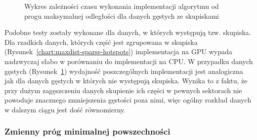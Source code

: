 \documentclass[12pt]{article}
\begin{document}
\begin{figure}[H]
\caption{Wykres zależności czasu wykonania implementacji algorytmu od progu maksymalnej odległości dla danych gęstych ze skupiskami}
\label{chart:maxdist-nonsparse-hotspots}
\end{figure}

Podobne testy zostały wykonane dla danych, w których występują tzw. skupiska. Dla rzadkich danych, których część jest zgrupowana w skupiska (Rysunek~\ref{chart:maxdist-sparse-hotspots}) implementacja na GPU wypada nadzwyczaj słabo w porównaniu do implementacji na CPU. W przypadku danych gęstych (Rysunek~\ref{chart:maxdist-nonsparse-hotspots}) 
wydajność poszczególnych implementacji jest analogiczna jak dla danych gęstych w których nie występują skupiska. Wynika to z faktu, że przy dużym zagęszczeniu danych skupienie ich części w pewnych sektorach nie powoduje znacznego zmniejszenia gęstości poza nimi, więc ogólny rozkład danych w dalszym ciągu jest dość równomierny.

\subsubsection{Zmienny próg minimalnej powszechności}
\end{document}
